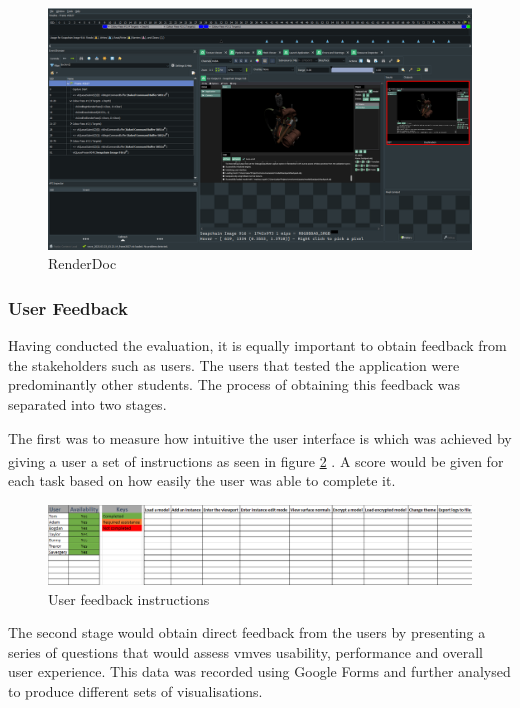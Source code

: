\documentclass[11pt]{article}
\begin{document}
\begin{figure}[H]
  \centering
  \includegraphics[width=\textwidth]{images/renderdoc.png}
  \caption{RenderDoc}
  \label{fig:renderdoc}
\end{figure}

\subsubsection{User Feedback}
Having conducted the evaluation, it is equally important to obtain feedback from
the stakeholders such as users. The users that tested the application were
predominantly other students. The process of obtaining this feedback was
separated into two stages.

The first was to measure how intuitive the user interface is which was achieved
by giving a user a set of instructions as seen in figure \ref{fig:instructions}
\textsuperscript{}.
A score would be given for each task based on how easily the user was able to
complete it.

\begin{figure}[H]
  \centering
  \includegraphics[width=\textwidth]{images/user_instructions.png}
  \caption{User feedback instructions }
  \label{fig:instructions}
\end{figure}

The second stage would obtain direct feedback from the users by presenting a
series of questions that would assess \glspl*{vmve} usability, performance and
overall user experience. This data was recorded using Google Forms and further
analysed to produce different sets of visualisations.
\end{document}
